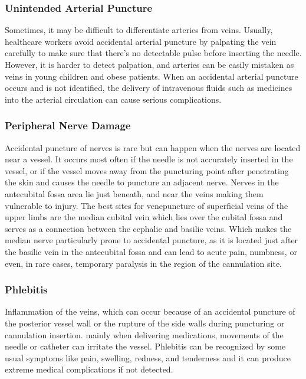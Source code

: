 
\subsubsection{Unintended Arterial Puncture}
Sometimes, it may be difficult to differentiate arteries from veins. Usually, healthcare workers avoid accidental arterial puncture by palpating the vein carefully to make sure that there's no detectable pulse before inserting the needle. 
However, it is harder to detect palpation, and arteries can be easily mistaken as veins in young children and obese patients. When an accidental arterial puncture occurs and is not identified, the delivery of intravenous fluids such as medicines into the arterial circulation can cause serious complications.

\subsubsection{Peripheral Nerve Damage}
Accidental puncture of nerves is rare but can happen when the nerves are located near a vessel. It occurs most often if the needle is not accurately inserted in the vessel, or if the vessel moves away from the puncturing point after penetrating the skin and causes the needle to puncture an adjacent nerve. Nerves in the antecubital fossa area lie just beneath, and near the veins making them vulnerable to injury.
The best sites for venepuncture of superficial veins of the upper limbs are the median cubital vein which lies over the cubital fossa and serves as a connection between the cephalic and basilic veins. Which makes the median nerve particularly prone to accidental puncture, as it is located just after the basilic vein in the antecubital fossa and can lead to acute pain, numbness, or even, in rare cases, temporary paralysis in the region of the cannulation site.

\subsubsection{Phlebitis}
Inflammation of the veins, which can occur because of an accidental puncture of the posterior vessel wall or the rupture of the side walls during puncturing or cannulation insertion. mainly when delivering medications, movements of the needle or catheter can irritate the vessel. Phlebitis can be recognized by some usual symptoms like pain, swelling, redness, and tenderness and it can produce extreme medical complications if not detected. 


